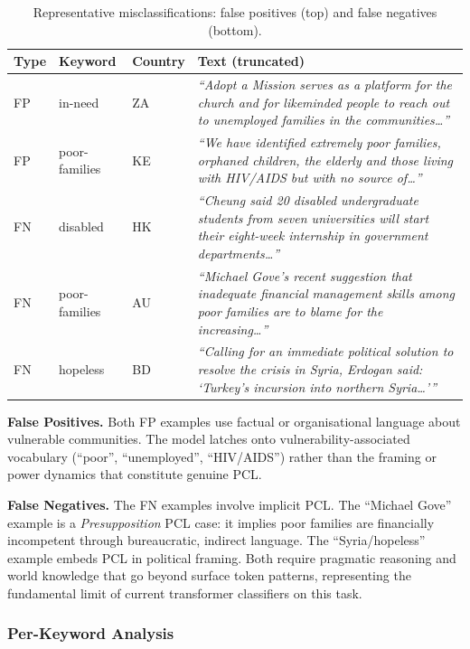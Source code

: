 \documentclass[11pt]{article}
\begin{document}
\begin{table}[H]
\centering
\small
\begin{tabular}{p{0.8cm}p{1.5cm}p{1.2cm}p{6.8cm}}
\toprule
Type & Keyword & Country & Text (truncated) \\
\midrule
FP & in-need & ZA & \textit{``Adopt a Mission serves as a platform for the church and for likeminded people to reach out to unemployed families in the communities\ldots''} \\[4pt]
FP & poor-families & KE & \textit{``We have identified extremely poor families, orphaned children, the elderly and those living with HIV/AIDS but with no source of\ldots''} \\
\midrule
FN & disabled & HK & \textit{``Cheung said 20 disabled undergraduate students from seven universities will start their eight-week internship in government departments\ldots''} \\[4pt]
FN & poor-families & AU & \textit{``Michael Gove's recent suggestion that inadequate financial management skills among poor families are to blame for the increasing\ldots''} \\[4pt]
FN & hopeless & BD & \textit{``Calling for an immediate political solution to resolve the crisis in Syria, Erdogan said: `Turkey's incursion into northern Syria\ldots'\thinspace''} \\
\bottomrule
\end{tabular}
\caption{Representative misclassifications: false positives (top) and false negatives (bottom).}
\label{tab:errors}
\end{table}

\textbf{False Positives.} Both FP examples use factual or organisational language about vulnerable communities. The model latches onto vulnerability-associated vocabulary (``poor'', ``unemployed'', ``HIV/AIDS'') rather than the framing or power dynamics that constitute genuine PCL.

\textbf{False Negatives.} The FN examples involve implicit PCL. The ``Michael Gove'' example is a \emph{Presupposition} PCL case: it implies poor families are financially incompetent through bureaucratic, indirect language. The ``Syria/hopeless'' example embeds PCL in political framing. Both require pragmatic reasoning and world knowledge that go beyond surface token patterns, representing the fundamental limit of current transformer classifiers on this task.

\subsubsection*{Per-Keyword Analysis}
\end{document}
